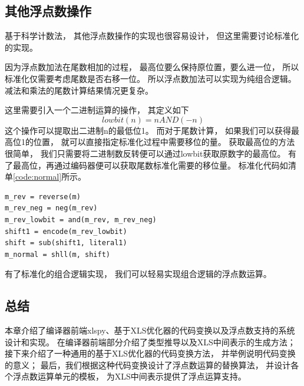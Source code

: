 \subsection{其他浮点数操作}

基于科学计数法，
其他浮点数操作的实现也很容易设计，
但这里需要讨论标准化的实现。

因为浮点数加法在尾数相加的过程，
最高位要么保持原位置，要么进一位，
所以标准化仅需要考虑尾数是否右移一位。
所以浮点数加法可以实现为纯组合逻辑。
减法和乘法的尾数计算结果情况更复杂。

这里需要引入一个二进制运算的操作，
其定义如下
$$lowbit(n) = n AND (-n)$$
这个操作可以提取出二进制n的最低位1。
而对于尾数计算，
如果我们可以获得最高位1的位置，
就可以直接指定标准化过程中需要移位的量。
获取最高位的方法很简单，
我们只需要将二进制数反转便可以通过lowbit获取原数字的最高位。
有了最高位，再通过编码器便可以获取尾数标准化需要的移位量。
标准化代码如清单\ref{code:normal}所示。

\begin{lstlisting}[label=code:normal, caption=浮点数标准化代码, captionpos=b]
m_rev = reverse(m)
m_rev_neg = neg(m_rev)
m_rev_lowbit = and(m_rev, m_rev_neg)
shift1 = encode(m_rev_lowbit)
shift = sub(shift1, literal1)
m_normal = shll(m, shift)
\end{lstlisting}

有了标准化的组合逻辑实现，
我们可以轻易实现组合逻辑的浮点数运算。

\subsection{总结}

本章介绍了编译器前端xlspy、基于XLS优化器的代码变换以及浮点数支持的系统设计和实现。
在编译器前端部分介绍了类型推导以及XLS中间表示的生成方法；
接下来介绍了一种通用的基于XLS优化器的代码变换方法，
并举例说明代码变换的意义；
最后，我们根据这种代码变换设计了浮点数运算的替换算法，
并设计各个浮点数运算单元的模板，
为XLS中间表示提供了浮点运算支持。
